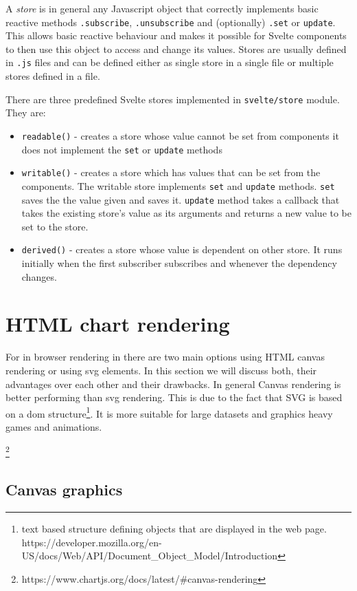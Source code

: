 A \textit{store} is in general any Javascript object that correctly implements basic reactive methods \verb|.subscribe|,  \verb|.unsubscribe| and (optionally) \verb|.set| or \verb|update|. This allows basic reactive behaviour and makes it possible for Svelte components to then use this object to access and change its values. Stores are usually defined in \verb|.js| files and can be defined either as single store in a single file or multiple stores defined in a file. 

There are three predefined Svelte stores implemented in \verb|svelte/store| module. They are:

\begin{itemize}
    \item \verb|readable()| - creates a store whose value cannot be set from components it does not implement the \verb|set| or \verb|update| methods
    \item \verb|writable()| - creates a store which has values that can be set from the components. The writable store implements \verb|set| and \verb|update| methods. \verb|set| saves the the value given and saves it. \verb|update| method takes a callback that takes the existing store's value as its arguments and returns a new value to be set to the store.
    \item \verb|derived()| - creates a store whose value is dependent on other store. It runs initially when the first subscriber subscribes and whenever the dependency changes.
\end{itemize}


\section{HTML chart rendering}

For in browser rendering in there are two main options using HTML canvas rendering or using \ac{svg} elements. In this section we will discuss both, their advantages over each other and their drawbacks. In general Canvas rendering is better performing than \ac{svg} rendering. This is due to the fact that SVG is based on a \ac{dom} structure\footnote{text based structure defining objects that are displayed in the web page. https://developer.mozilla.org/en-US/docs/Web/API/Document\_Object\_Model/Introduction}. It is more suitable for large datasets and graphics heavy games and animations. 

\footnote{https://www.chartjs.org/docs/latest/\#canvas-rendering}


\subsection{Canvas graphics}


